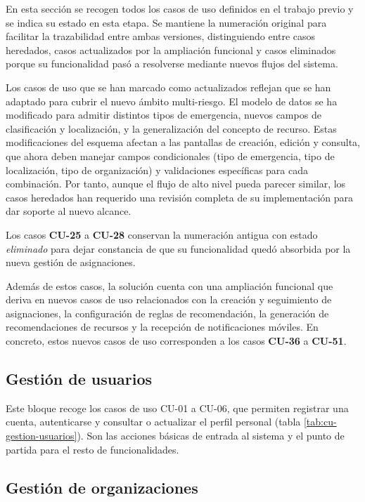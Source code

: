 En esta sección se recogen todos los casos de uso definidos en el trabajo previo y se indica su estado en esta etapa. Se mantiene la numeración original para facilitar la trazabilidad entre ambas versiones, distinguiendo entre casos heredados, casos actualizados por la ampliación funcional y casos eliminados porque su funcionalidad pasó a resolverse mediante nuevos flujos del sistema.

Los casos de uso que se han marcado como actualizados reflejan que se han adaptado para cubrir el nuevo ámbito multi-riesgo. El modelo de datos se ha modificado para admitir distintos tipos de emergencia, nuevos campos de clasificación y localización, y la generalización del concepto de recurso. Estas modificaciones del esquema afectan a las pantallas de creación, edición y consulta, que ahora deben manejar campos condicionales (tipo de emergencia, tipo de localización, tipo de organización) y validaciones específicas para cada combinación. Por tanto, aunque el flujo de alto nivel pueda parecer similar, los casos heredados han requerido una revisión completa de su implementación para dar soporte al nuevo alcance.

Los casos \textbf{CU-25} a \textbf{CU-28} conservan la numeración antigua con estado \emph{eliminado} para dejar constancia de que su funcionalidad quedó absorbida por la nueva gestión de asignaciones.

Además de estos casos, la solución cuenta con una ampliación funcional que deriva en nuevos casos de uso relacionados con la creación y seguimiento de asignaciones, la configuración de reglas de recomendación, la generación de recomendaciones de recursos y la recepción de notificaciones móviles. En concreto, estos nuevos casos de uso corresponden a los casos \textbf{CU-36} a \textbf{CU-51}.

\subsection{Gestión de usuarios}

Este bloque recoge los casos de uso CU-01 a CU-06, que permiten registrar una cuenta, autenticarse y consultar o actualizar el perfil personal (tabla \ref{tab:cu-gestion-usuarios}). Son las acciones básicas de entrada al sistema y el punto de partida para el resto de funcionalidades.



\subsection{Gestión de organizaciones}

